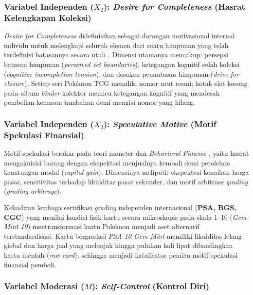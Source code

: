\documentclass[12pt,a4paper]{article}
\numberwithin{equation}{section}
\numberwithin{table}{section}
\numberwithin{figure}{section}
\begin{document}
\subsubsection{Variabel Independen ($X_2$): \emph{Desire for Completeness} (Hasrat Kelengkapan Koleksi)}

\emph{Desire for Completeness} didefinisikan sebagai dorongan motivasional internal individu untuk melengkapi seluruh elemen dari suatu himpunan yang telah terdefinisi batasannya secara utuh \citep{belk1995collecting, gao2014completing, barasz2017pseudo}. Dimensi utamanya mencakup: persepsi batasan himpunan (\emph{perceived set boundaries}), ketegangan kognitif celah koleksi (\emph{cognitive incompletion tension}), dan desakan penuntasan himpunan (\emph{drive for closure}). Setiap seri Pok\'emon TCG memiliki nomor urut resmi; kotak slot kosong pada album \emph{binder} kolektor memicu ketegangan kognitif yang mendesak pembelian kemasan tambahan demi mengisi nomor yang hilang.

\subsubsection{Variabel Independen ($X_3$): \emph{Speculative Motive} (Motif Spekulasi Finansial)}

Motif spekulasi berakar pada teori moneter \citet{keynes1936general} dan \emph{Behavioral Finance} \citep{shiller2000irrational, baur2018bitcoin}, yaitu hasrat mengakuisisi barang dengan ekspektasi menjualnya kembali demi perolehan keuntungan modal (\emph{capital gain}). Dimensinya meliputi: ekspektasi kenaikan harga pasar, sensitivitas terhadap likuiditas pasar sekunder, dan motif arbitrase \emph{grading} (\emph{grading arbitrage}).

Kehadiran lembaga sertifikasi \emph{grading} independen internasional (\textbf{PSA, BGS, CGC}) yang menilai kondisi fisik kartu secara mikroskopis pada skala 1--10 (\emph{Gem Mint 10}) mentransformasi kartu Pok\'emon menjadi aset alternatif terstandardisasi. Kartu bergradasi \emph{PSA 10 Gem Mint} memiliki likuiditas lelang global dan harga jual yang melonjak hingga puluhan kali lipat dibandingkan kartu mentah (\emph{raw card}), sehingga menjadi katalisator pemicu motif spekulasi finansial pembeli.

\subsubsection{Variabel Moderasi ($M$): \emph{Self-Control} (Kontrol Diri)}
\end{document}
